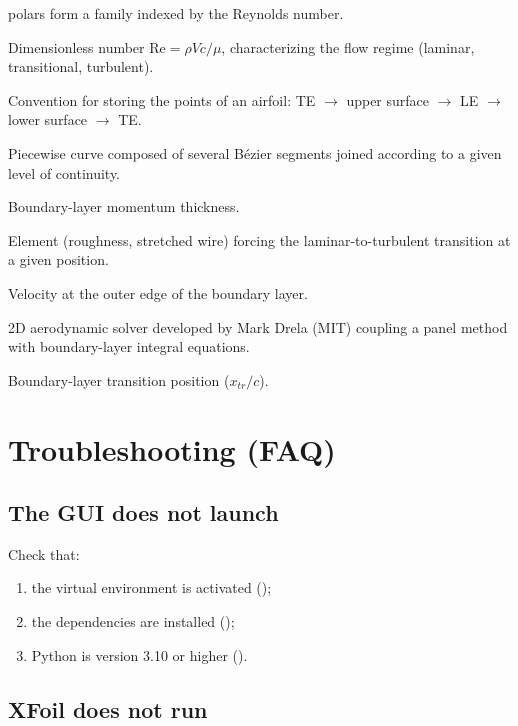 \begin{description}
        polars form a family indexed by the Reynolds number.
    \item[Reynolds] Dimensionless number
        $\mathrm{Re} = \rho V c / \mu$, characterizing the flow
        regime (laminar, transitional, turbulent).
    \item[Selig] Convention for storing the points of an airfoil:
        TE $\to$ upper surface $\to$ LE $\to$ lower surface $\to$ TE.
    \item[Spline] Piecewise curve composed of several
        Bézier segments joined according to a given level of
        continuity.
    \item[$\theta$] Boundary-layer momentum thickness.
    \item[Trip / Turbulator] Element (roughness, stretched wire) forcing
        the laminar-to-turbulent transition at a given position.
    \item[$U_e$] Velocity at the outer edge of the boundary layer.
    \item[XFoil] 2D aerodynamic solver developed by Mark Drela
        (MIT) coupling a panel method with boundary-layer
        integral equations.
    \item[XTR] Boundary-layer transition position ($x_{tr}/c$).
\end{description}

\section{Troubleshooting (FAQ)}

\subsection*{The GUI does not launch}

Check that:

\begin{enumerate}
    \item the virtual environment is activated ();
    \item the dependencies are installed ();
    \item Python is version 3.10 or higher
        ().
\end{enumerate}

\subsection*{XFoil does not run}

